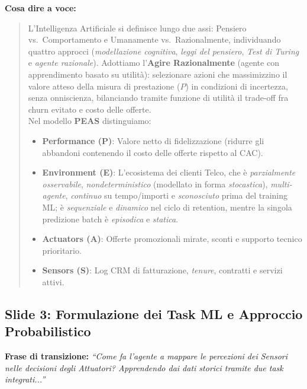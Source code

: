 \documentclass[11pt, a4paper]{article}
\begin{document}
\noindent \textbf{Cosa dire a voce:}
\begin{quote}
L'Intelligenza Artificiale si definisce lungo due assi: Pensiero vs.\ Comportamento e Umanamente vs.\ Razionalmente, individuando quattro approcci (\textit{modellazione cognitiva}, \textit{leggi del pensiero}, \textit{Test di Turing} e \textit{agente razionale}). Adottiamo l'\textbf{Agire Razionalmente} (agente con apprendimento basato su utilità): selezionare azioni che massimizzino il valore atteso della misura di prestazione ($P$) in condizioni di incertezza, senza onniscienza, bilanciando tramite funzione di utilità il trade-off fra churn evitato e costo delle offerte.\\[3pt]
Nel modello \textbf{PEAS} distinguiamo:
\begin{itemize}
    \item \textbf{Performance (P)}: Valore netto di fidelizzazione (ridurre gli abbandoni contenendo il costo delle offerte rispetto al CAC).
    \item \textbf{Environment (E)}: L'ecosistema dei clienti Telco, che è \textit{parzialmente osservabile}, \textit{nondeterministico} (modellato in forma \textit{stocastica}), \textit{multi-agente}, \textit{continuo} su tempo/importi e \textit{sconosciuto} prima del training ML; è \textit{sequenziale} e \textit{dinamico} nel ciclo di retention, mentre la singola predizione batch è \textit{episodica} e \textit{statica}.
    \item \textbf{Actuators (A)}: Offerte promozionali mirate, sconti e supporto tecnico prioritario.
    \item \textbf{Sensors (S)}: Log CRM di fatturazione, \textit{tenure}, contratti e servizi attivi.
\end{itemize}
\end{quote}

\subsection*{Slide 3: Formulazione dei Task ML e Approccio Probabilistico}
\noindent \textbf{Frase di transizione:} \textit{``Come fa l'agente a mappare le percezioni dei Sensori nelle decisioni degli Attuatori? Apprendendo dai dati storici tramite due task integrati...''}
\end{document}
